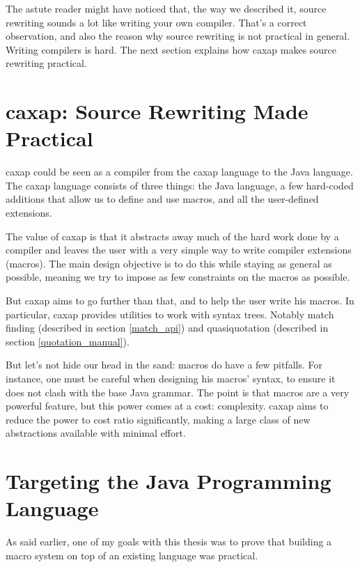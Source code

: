 The astute reader might have noticed that, the way we described it, source
rewriting sounds a lot like writing your own compiler. That's a correct
observation, and also the reason why source rewriting is not practical in
general. Writing compilers is hard. The next section explains how caxap makes
source rewriting practical.

\section{caxap: Source Rewriting Made Practical}

caxap could be seen as a compiler from the caxap language to the Java
language. The caxap language consists of three things: the Java language, a few
hard-coded additions that allow us to define and use macros, and all the
user-defined extensions.

The value of caxap is that it abstracts away much of the hard work done by a
compiler and leaves the user with a very simple way to write compiler extensions
(macros). The main design objective is to do this while staying as general as
possible, meaning we try to impose as few constraints on the macros as possible.

But caxap aims to go further than that, and to help the user write his
macros. In particular, caxap provides utilities to work with syntax
trees. Notably match finding (described in section \ref{match_api}) and
quasiquotation (described in section \ref{quotation_manual}).

But let's not hide our head in the sand: macros do have a few pitfalls. For
instance, one must be careful when designing his macros' syntax, to ensure it
does not clash with the base Java grammar. The point is that macros are a very
powerful feature, but this power comes at a cost: complexity. caxap aims to
reduce the power to cost ratio significantly, making a large class of new
abstractions available with minimal effort.

\section{Targeting the Java Programming Language}

As said earlier, one of my goals with this thesis was to prove that building a
macro system on top of an existing language was practical.

